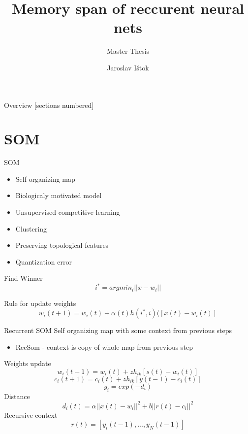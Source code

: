 \documentclass[10pt]{beamer}
\title{Memory span of reccurent neural nets}
\subtitle{Master Thesis}
\date{}
\author{Jaroslav Ištok}
\begin{document}
\maketitle

\begin{frame}{Overview}
  [sections numbered]
  \tableofcontents[hideallsubsections]
\end{frame}

\section{SOM}


\begin{frame}[fragile]{SOM}

\begin{itemize}
\item Self organizing map
\item Biologicaly motivated model
\item Unsupervised competitive learning
\item Clustering
\item Preserving topological features
\item Quantization error
\end{itemize}

Find Winner
\begin{equation*}
i^* = argmin_i||x-w_i|| 
\end{equation*}

Rule for update weights
\begin{equation*}
w_i(t+1) = w_i(t) + \alpha(t)h(i^*, i)([x(t) - w_i(t)]
\end{equation*}

\end{frame}

\begin{frame}[fragile]{Recurrent SOM}
Self organizing map with some context from previous steps
\begin{itemize}
\item RecSom - context is copy of whole map from previous step
\end{itemize}
Weights update
\begin{equation*}
w_i(t+1) = w_i(t) + zh_{ik}[s(t) - w_i(t)]
\end{equation*}
\begin{equation*}
c_i(t+1) = c_i(t) + zh_{ik}[y(t - 1) - c_i(t)]
\end{equation*}
\begin{equation*}
y_i=exp(-d_i)
\end{equation*}
Distance
\begin{equation*}
d_i(t) = \alpha||x(t)-w_i||^2 + b||r(t)-c_i||^2
\end{equation*}
Recursive context
\begin{equation*}
r(t)=[y_i(t-1),...,y_N(t-1)]
\end{equation*}



\end{frame}
\end{document}

